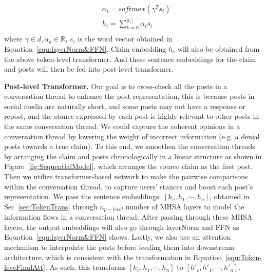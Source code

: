 \begin{equation}\label{equ:Token-leveFinalAtt}
    \begin{split}
        & \alpha_i= softmax(\gamma^T s_i) \\
        & h_i=\sum_{k=0}^{|t_i|} \alpha_i s_i\\
    \end{split}
\end{equation}
where $\gamma \in d, \alpha_k \in \mathbb{R}$, $s_i$ is the word vector obtained in Equation~\ref{equ:layerNorm&FFN}. Claim embedding $h_c$ will also be obtained from the above token-level transformer. And these sentence embeddings for the claim and posts will then be fed into post-level transformer.

\textbf{Post-level Transformer.}\label{sec:PostTrans}
Our goal is to cross-check all the posts in a conversation thread to enhance the post representation, this is because posts in social media are naturally short, and some posts may not have a response or repost, and the stance expressed by each post is highly relevant to other posts in the same conversation thread. We could capture the coherent opinions in a conversation thread by lowering the weight of incorrect information (e.g. a denial posts towards a true claim). To this end, we smoothen the conversation threads by arranging the claim and posts chronologically in a linear structure as shown in Figure~\ref{fig:SequentialModel}, which arranges the source claim as the first post. Then we utilize transformer-based network to make the pairwise comparisons within the conversation thread, to capture users' stances and boost each post's representation. We pass the sentence embeddings: $[h_c, h_1, \cdots, h_n]$, obtained in Sec~\ref{sec:TokenTrans} through $n_{p-level}$ number of MHSA layers to model the information flows in a conversation thread. After passing through these MHSA layers, the output embeddings will also go through layerNorm and FFN as Equation~\ref{equ:layerNorm&FFN} shows. Lastly, we also use an attention mechanism to interpolate the posts before feeding them into downstream architecture, which is consistent with the transformation in Equation~\ref{equ:Token-leveFinalAtt}. As such, this transforms $[h_c, h_1, \cdots, h_n]$ to $[h'_c, h'_1, \cdots, h'_n]$.
